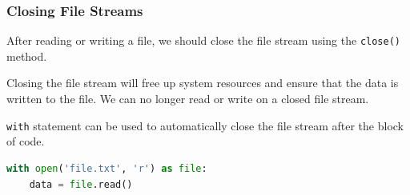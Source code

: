 \documentclass[beamer, en, version=2.0]{huangfusl-template}
\begin{document}
    \begin{frame}[fragile]
        \frametitle{Closing File Streams}

        After reading or writing a file, we should close the file stream using the {\footnotesize\verb|close()|} method.

        Closing the file stream will free up system resources and ensure that the data is written to the file. We can no longer read or write on a closed file stream.

        {\footnotesize\verb|with|} statement can be used to automatically close the file stream after the block of code.

\begin{lstlisting}[language=python]
with open('file.txt', 'r') as file:
    data = file.read()
\end{lstlisting}
    \end{frame}
    \section*{}
    \begin{frame}
        \mythanks
    \end{frame}
\end{document}
